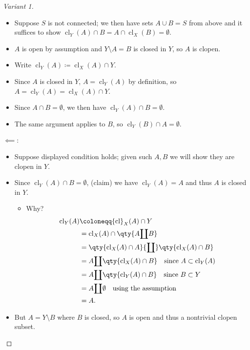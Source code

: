 \begin{solution}
\begin{proof}[Variant 1]
\begin{itemize}
\tightlist
\item
  Suppose \(S\) is not connected; we then have sets \(A \cup B = S\)
  from above and it suffices to show
  \({ \operatorname{cl}} _Y(A) \cap B = A \cap{ \operatorname{cl}} _X(B) = \emptyset\).
\item
  \(A\) is open by assumption and \(Y\setminus A = B\) is closed in
  \(Y\), so \(A\) is clopen.
\item
  Write
  \({ \operatorname{cl}} _Y(A) \coloneqq{ \operatorname{cl}} _X(A) \cap Y\).
\item
  Since \(A\) is closed in \(Y\), \(A = { \operatorname{cl}} _Y(A)\) by
  definition, so
  \(A = { \operatorname{cl}} _Y(A) = { \operatorname{cl}} _X(A) \cap Y\).
\item
  Since \(A\cap B = \emptyset\), we then have
  \({ \operatorname{cl}} _Y(A) \cap B = \emptyset\).
\item
  The same argument applies to \(B\), so
  \({ \operatorname{cl}} _Y(B) \cap A = \emptyset\).
\end{itemize}

\(\impliedby\):

\begin{itemize}
\tightlist
\item
  Suppose displayed condition holds; given such \(A, B\) we will show
  they are clopen in \(Y\).
\item
  Since \({ \operatorname{cl}} _Y(A) \cap B = \emptyset\), (claim) we
  have \({ \operatorname{cl}} _Y(A) = A\) and thus \(A\) is closed in
  \(Y\).

  \begin{itemize}
  \tightlist
  \item
    Why?
    \begin{align*}     { \operatorname{cl}} _Y(A) &\coloneqq{ \operatorname{cl}} _X(A) \cap Y \\      &= { \operatorname{cl}} _X(A) \cap\qty{A{\coprod}B} \\      &= \qty{{ \operatorname{cl}} _X(A) \cap A} {\coprod}\qty{{ \operatorname{cl}} _X(A) \cap B} \\     &= A  {\coprod}\qty{{ \operatorname{cl}} _X(A) \cap B}      \quad\text{since } A \subset { \operatorname{cl}} _Y(A) \\     &= A {\coprod}\qty{{ \operatorname{cl}} _Y(A) \cap B}      \quad \text{since } B \subset Y \\     &= A {\coprod}\emptyset \quad\text{using the assumption} \\     &= A     .\end{align*}
  \end{itemize}
\item
  But \(A = Y\setminus B\) where \(B\) is closed, so \(A\) is open and
  thus a nontrivial clopen subset.
\end{itemize}


\end{proof}
\end{solution}
